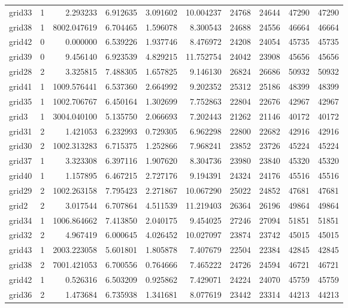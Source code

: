 \begin{longtable}{|l|r|r|r|r|r|r|r|r|r|}
grid33 & 1 & 2.293233 & 6.912635 & 3.091602 & 10.004237 & 24768 & 24644 & 47290 & 47290 \\
grid38 & 1 & 8002.047619 & 6.704465 & 1.596078 & 8.300543 & 24688 & 24556 & 46664 & 46664 \\
grid42 & 0 & 0.000000 & 6.539226 & 1.937746 & 8.476972 & 24208 & 24054 & 45735 & 45735 \\
grid39 & 0 & 9.456140 & 6.923539 & 4.829215 & 11.752754 & 24042 & 23908 & 45656 & 45656 \\
grid28 & 2 & 3.325815 & 7.488305 & 1.657825 & 9.146130 & 26824 & 26686 & 50932 & 50932 \\
grid41 & 1 & 1009.576441 & 6.537360 & 2.664992 & 9.202352 & 25312 & 25186 & 48399 & 48399 \\
grid35 & 1 & 1002.706767 & 6.450164 & 1.302699 & 7.752863 & 22804 & 22676 & 42967 & 42967 \\
grid3 & 1 & 3004.040100 & 5.135750 & 2.066693 & 7.202443 & 21262 & 21146 & 40172 & 40172 \\
grid31 & 2 & 1.421053 & 6.232993 & 0.729305 & 6.962298 & 22800 & 22682 & 42916 & 42916 \\
grid30 & 2 & 1002.313283 & 6.715375 & 1.252866 & 7.968241 & 23852 & 23726 & 45224 & 45224 \\
grid37 & 1 & 3.323308 & 6.397116 & 1.907620 & 8.304736 & 23980 & 23840 & 45320 & 45320 \\
grid40 & 1 & 1.157895 & 6.467215 & 2.727176 & 9.194391 & 24324 & 24176 & 45516 & 45516 \\
grid29 & 2 & 1002.263158 & 7.795423 & 2.271867 & 10.067290 & 25022 & 24852 & 47681 & 47681 \\
grid2 & 2 & 3.017544 & 6.707864 & 4.511539 & 11.219403 & 26364 & 26196 & 49864 & 49864 \\
grid34 & 1 & 1006.864662 & 7.413850 & 2.040175 & 9.454025 & 27246 & 27094 & 51851 & 51851 \\
grid32 & 2 & 4.967419 & 6.000645 & 4.026452 & 10.027097 & 23874 & 23742 & 45015 & 45015 \\
grid43 & 1 & 2003.223058 & 5.601801 & 1.805878 & 7.407679 & 22504 & 22384 & 42845 & 42845 \\
grid38 & 2 & 7001.421053 & 6.700556 & 0.764666 & 7.465222 & 24726 & 24594 & 46721 & 46721 \\
grid42 & 1 & 0.526316 & 6.503209 & 0.925862 & 7.429071 & 24224 & 24070 & 45759 & 45759 \\
grid36 & 2 & 1.473684 & 6.735938 & 1.341681 & 8.077619 & 23442 & 23314 & 44213 & 44213 \\

\end{longtable}
